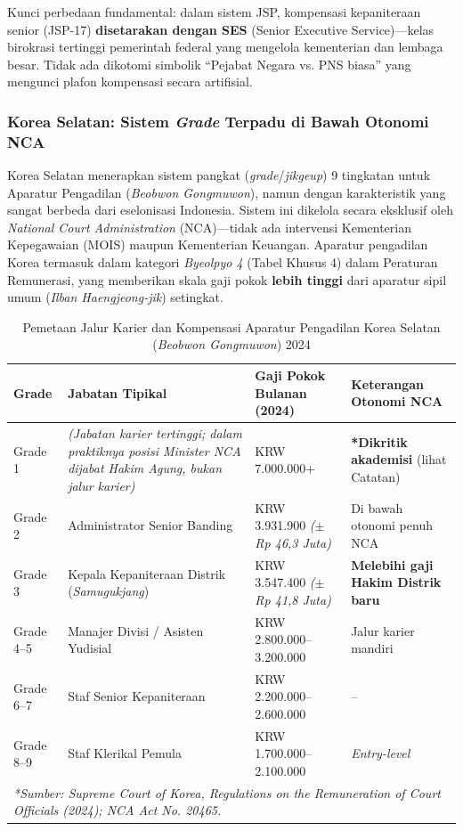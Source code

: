 \documentclass[12pt, a4paper]{article}
\begin{document}
Kunci perbedaan fundamental: dalam sistem JSP, kompensasi kepaniteraan senior (JSP-17) \textbf{disetarakan dengan SES} (Senior Executive Service)---kelas birokrasi tertinggi pemerintah federal yang mengelola kementerian dan lembaga besar. Tidak ada dikotomi simbolik ``Pejabat Negara vs. PNS biasa'' yang mengunci plafon kompensasi secara artifisial.

\subsubsection{Korea Selatan: Sistem \textit{Grade} Terpadu di Bawah Otonomi NCA}

Korea Selatan menerapkan sistem pangkat (\textit{grade}/\textit{jikgeup}) 9 tingkatan untuk Aparatur Pengadilan (\textit{Beobwon Gongmuwon}), namun dengan karakteristik yang sangat berbeda dari eselonisasi Indonesia. Sistem ini dikelola secara eksklusif oleh \textit{National Court Administration} (NCA)---tidak ada intervensi Kementerian Kepegawaian (MOIS) maupun Kementerian Keuangan. Aparatur pengadilan Korea termasuk dalam kategori \textit{Byeolpyo 4} (Tabel Khusus 4) dalam Peraturan Remunerasi, yang memberikan skala gaji pokok \textbf{lebih tinggi} dari aparatur sipil umum (\textit{Ilban Haengjeong-jik}) setingkat.

\begin{table}[H]
\centering
\fontsize{9}{11}\selectfont
\caption{Pemetaan Jalur Karier dan Kompensasi Aparatur Pengadilan Korea Selatan (\textit{Beobwon Gongmuwon}) 2024}
\label{tab:korea-grade}
\renewcommand{\arraystretch}{1.35}
\begin{tabular}{p{2.0cm} p{4.5cm} p{3.5cm} p{3.5cm}}
\hline
\textbf{Grade} & \textbf{Jabatan Tipikal} & \textbf{Gaji Pokok Bulanan (2024)} & \textbf{Keterangan Otonomi NCA} \tabularnewline
\hline
Grade 1 & \textit{(Jabatan karier tertinggi; dalam praktiknya posisi Minister NCA dijabat Hakim Agung, bukan jalur karier)} & KRW 7.000.000+ & \textbf{*Dikritik akademisi} (lihat Catatan) \tabularnewline
Grade 2 & Administrator Senior Banding & KRW 3.931.900 \newline \textit{($\pm$ Rp 46,3 Juta)} & Di bawah otonomi penuh NCA \tabularnewline
Grade 3 & Kepala Kepaniteraan Distrik \newline (\textit{Samugukjang}) & KRW 3.547.400 \newline \textit{($\pm$ Rp 41,8 Juta)} & \textbf{Melebihi gaji Hakim Distrik baru} \tabularnewline
Grade 4--5 & Manajer Divisi / Asisten Yudisial & KRW 2.800.000--3.200.000 & Jalur karier mandiri \tabularnewline
Grade 6--7 & Staf Senior Kepaniteraan & KRW 2.200.000--2.600.000 & -- \tabularnewline
Grade 8--9 & Staf Klerikal Pemula & KRW 1.700.000--2.100.000 & \textit{Entry-level} \tabularnewline
\hline
\multicolumn{4}{p{13.5cm}}{\textit{*Sumber: Supreme Court of Korea, Regulations on the Remuneration of Court Officials (2024); NCA Act No. 20465.}} \tabularnewline
\hline
\end{tabular}
\end{table}
\end{document}
